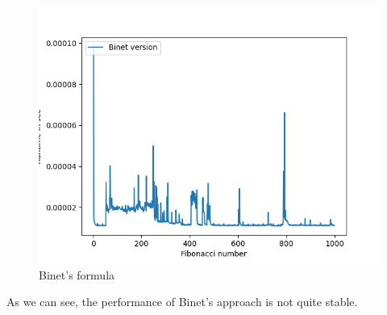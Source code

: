\documentclass{article}
\begin{document}
\begin{flushleft}
\begin{enumerate}[(a)]
\begin{itemize}
\begin{figure}[H]
        \centering
        \includegraphics{binet.png}
        \caption{Binet's formula}
    \end{figure}
    As we can see, the performance of Binet's approach is not quite stable.
    \end{itemize}
\end{enumerate}    
\end{flushleft}
\end{document}
